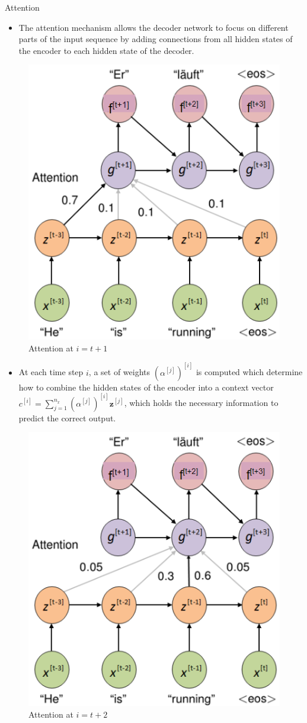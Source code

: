 \begin{vbframe}{Attention}
   \framebreak
   
   \begin{itemize}  
    \item The attention mechanism allows the decoder network to focus on different parts of the input sequence by adding connections from all hidden states of the encoder to each hidden state of the decoder.
  \end{itemize}
 \begin{figure}
    \includegraphics[width=4.cm]{plots/seq2seq_3.png}
    \caption{Attention at $i=t+1$}
  \end{figure}
 
\framebreak
\begin{itemize}  
    \item At each time step $i$, a set of weights $(\alpha^{[j]})^{[i]}$ is computed which determine how to combine the hidden states of the encoder into a context vector $c^{[i]}= \sum_{j=1}^{n_x} (\alpha^{[j]})^{[i]} \bm{z}^{[j]}$, which holds the necessary information to predict the correct output.
  \end{itemize}
  \begin{figure}
    \includegraphics[width=4.cm]{plots/seq2seq_4.png}
    \caption{Attention at $i=t+2$}
  \end{figure}
  

\end{vbframe}
